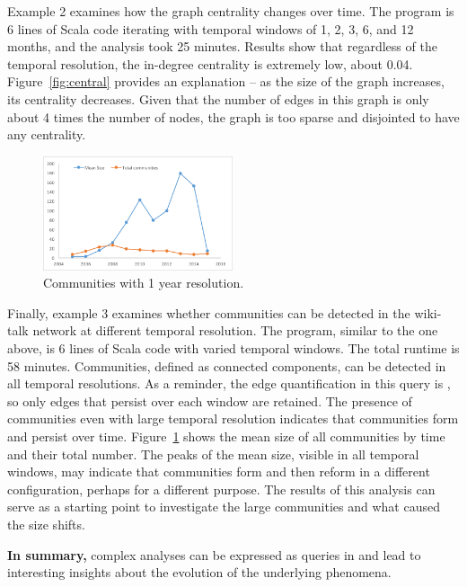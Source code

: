 Example 2 examines how the graph centrality changes over time.  The
program is 6 lines of Scala code iterating with temporal windows of 1,
2, 3, 6, and 12 months, and the analysis took 25 minutes.  Results
show that regardless of the temporal resolution, the in-degree
centrality is extremely low, about 0.04.  Figure~\ref{fig:central}
provides an explanation -- as the size of the graph increases, its
centrality decreases.  Given that the number of edges in this graph is
only about 4 times the number of nodes, the graph is too sparse and
disjointed to have any centrality.


\begin{figure}
\centering
\includegraphics[width=2.2in]{figs/communities.png}
\caption{Communities with 1 year resolution.}
\label{fig:commun}
\end{figure}

Finally, example 3 examines whether communities can be detected in the
wiki-talk network at different temporal resolution.  The program,
similar to the one above, is 6 lines of Scala code with varied
temporal windows.  The total runtime is 58 minutes.  Communities,
defined as connected components, can be detected in all temporal
resolutions.  As a reminder, the edge quantification in this query is
, so only edges that persist over each window are
retained.  The presence of communities even with large temporal
resolution indicates that communities form and persist over time.
Figure~\ref{fig:commun} shows the mean size of all communities by time
and their total number.  The peaks of the mean size, visible in all
temporal windows, may indicate that communities form and then reform
in a different configuration, perhaps for a different purpose.  The
results of this analysis can serve as a starting point to investigate
the large communities and what caused the size shifts.

{\bf In summary,} complex analyses can be expressed as queries in \ql
and lead to interesting insights about the evolution of the underlying
phenomena.
